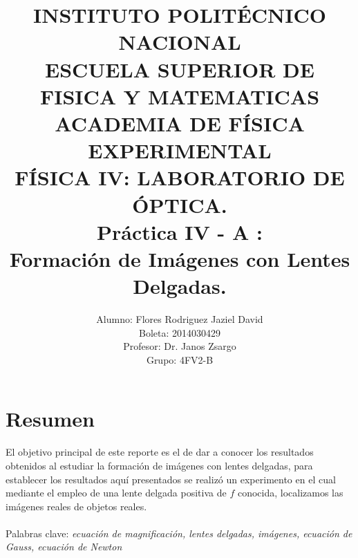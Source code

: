 \documentclass[13,twocolumn,letterpaper]{article}
\title{
    		\usefont{OT1}{bch}{b}{n}
    		\normalfont \normalsize \textsc{INSTITUTO POLITÉCNICO NACIONAL \\ 
    		ESCUELA SUPERIOR DE FISICA Y MATEMATICAS \\
    		ACADEMIA DE FÍSICA EXPERIMENTAL} \\ 
    		FÍSICA IV: LABORATORIO DE ÓPTICA. \\[10pt]
    		\huge Práctica IV - A :\\
    Formación de Imágenes con Lentes Delgadas.\\
    }
\author[0]{Alumno: Flores Rodriguez Jaziel David \\
    Boleta: 2014030429 \\
    Profesor: Dr. Janos Zsargo\\
    Grupo: 4FV2-B \\
            }
\begin{document}
    
    \maketitle
   
    
    \section*{Resumen}
    El objetivo principal de este reporte es el de dar a conocer los resultados obtenidos al estudiar la formación de imágenes con lentes delgadas, para establecer los resultados aquí presentados se  realizó un experimento en el cual mediante el empleo de una lente delgada positiva de $f$ conocida, localizamos las imágenes reales de objetos reales. \\\\
	Palabras clave: \emph{ecuación de magnificación, lentes delgadas, imágenes, ecuación de Gauss, ecuación de Newton} \\ 
\end{document}
